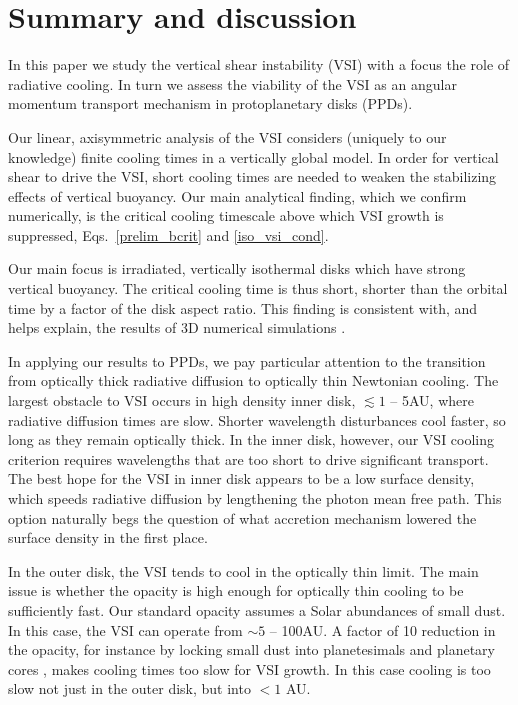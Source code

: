 \section{Summary and discussion}\label{summary}
In this paper we study the vertical shear instability (VSI) with a focus the 
role of radiative cooling.  In turn we assess the viability of the VSI 
as an angular momentum transport mechanism in protoplanetary disks (PPDs).

Our linear, axisymmetric analysis of the VSI 
considers (uniquely to our knowledge) finite cooling times in a vertically global model.  
In order for vertical shear to drive the VSI, short cooling times are needed to weaken 
the stabilizing effects of vertical buoyancy. Our main analytical finding, which we confirm numerically, 
is the critical cooling  timescale above which VSI growth is suppressed, Eqs.\ \ref{prelim_bcrit} and \ref{iso_vsi_cond}.


Our main focus is irradiated, vertically isothermal disks which have strong vertical buoyancy.
The critical cooling time is thus short, shorter than the orbital time by a factor of the disk
aspect ratio.  This finding is consistent with, and helps explain, the results of 3D numerical simulations .

In applying our results to PPDs, we pay particular attention to the transition from 
optically thick radiative diffusion to optically thin Newtonian cooling.  The largest obstacle to VSI occurs in 
high density inner disk, $\lesssim 1$ -- 5AU, where radiative diffusion times are slow.  Shorter wavelength disturbances
 cool faster, so long as they remain optically thick.  In the inner disk, however, our VSI cooling criterion requires 
 wavelengths that are too short to drive significant transport.  The best hope for the VSI in inner disk appears to 
 be a low surface density, which speeds radiative diffusion by lengthening the photon mean free path.  This option naturally begs 
 the question of what accretion mechanism lowered the surface density in the first place. 
 
 In the outer disk, the VSI tends to cool in the optically thin limit.  The main issue is whether the opacity 
 is high enough for optically thin cooling to be sufficiently fast.  Our standard opacity assumes a Solar abundances of small dust.
 In this case, the VSI can operate from $\sim 5$ -- 100AU.  
A factor of 10 reduction in the opacity, for instance by locking
 small dust into planetesimals and planetary cores \citep{youdin13}, makes cooling times too slow for VSI growth.  
 In this case cooling is too slow not just in the outer disk, but into  $< 1$ AU.
 
